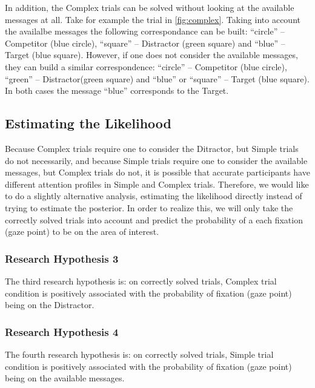 In addition, the Complex trials can be solved without looking at the available messages at all. Take for example the trial in \autoref{fig:complex}. Taking into account the availalbe messages the following correspondance can be built: ``circle'' -- Competitor (blue circle), ``square'' -- Distractor (green square) and ``blue'' -- Target (blue square). However, if one does not consider the available messages, they can build a similar correspondence: ``circle'' -- Competitor (blue circle), ``green'' -- Distractor(green square) and ``blue'' or ``square'' -- Target (blue square). In both cases the message ``blue'' corresponds to the Target.

\subsection{Estimating the Likelihood}
\label{sec:likelihood}

Because Complex trials require one to consider the Ditractor, but Simple trials do not necessarily, and because Simple trials require one to consider the available messages, but Complex trials do not, it is possible that accurate participants have different attention profiles in Simple and Complex trials. Therefore, we would like to do a slightly alternative analysis, estimating the likelihood directly instead of trying to estimate the posterior. In order to realize this, we will only take the correctly solved trials into account and predict the probability of a each fixation (gaze point) to be on the area of interest.

\subsubsection{Research Hypothesis 3}
\label{sec:h3}
The third research hypothesis is: on correctly solved trials, Complex trial condition is positively associated with the probability of fixation (gaze point) being on the Distractor. 

\subsubsection{Research Hypothesis 4}
\label{sec:h4}
The fourth research hypothesis is: on correctly solved trials, Simple trial condition is positively associated with the probability of fixation (gaze point) being on the available messages.


